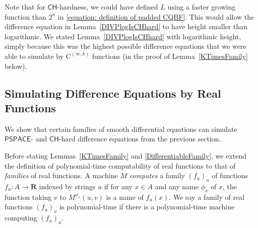 \documentclass{lmcs}
\theoremstyle{definition}
\theoremstyle{remark}
\newcommand{\R}{\mathbf R}
\newcommand{\classP}{\mathsf{P}}
\newcommand{\classPSPACE}{\mathsf{PSPACE}}
\newcommand{\classCH}{\mathsf{CH}}
\newcommand{\quantC}{\mathsf{C}}
\newcommand{\classC}{\mathrm C}
\begin{document}


Note that for $\classCH$-hardness, 
we could have defined $L$ using a faster growing function than $2 ^n$ in
\eqref{equation: definition of padded CQBF}. 
This would allow the difference equation in Lemma~\ref{DIVPlogIsCHhard}
to have height smaller than logarithmic. 
We stated Lemma~\ref{DIVPlogIsCHhard} with logarithmic height, 
simply because this was the highest possible difference equations
that we were able to simulate by $\classC ^{(\infty, k)}$ functions
(in the proof of Lemma~\ref{KTimesFamily} below). 

\subsection{Simulating Difference Equations by Real Functions}
\label{subsection: ode family}
We show that certain families of smooth differential equations can simulate 
$\classPSPACE$- and $\classCH$-hard difference equations from the previous section.

Before stating Lemmas~\ref{KTimesFamily} and \ref{DifferentiableFamily},
we extend the definition of polynomial-time computability of real functions
to that of \emph{families} of real functions.
A machine $M$ \emph{computes} a family $(f_u)_u$ of functions $f _u \colon A \to \R$ 
indexed by strings $u$
if for any $x \in A$ and any name $\phi_x$ of $x$,
the function taking $v$ to $M ^{\phi _x} (u, v)$ is a name of $f _u (x)$.
We say a family of real functions $(f_u)_u$ is polynomial-time if there is
a polynomial-time machine computing $(f_u)_u$.
\end{document}
